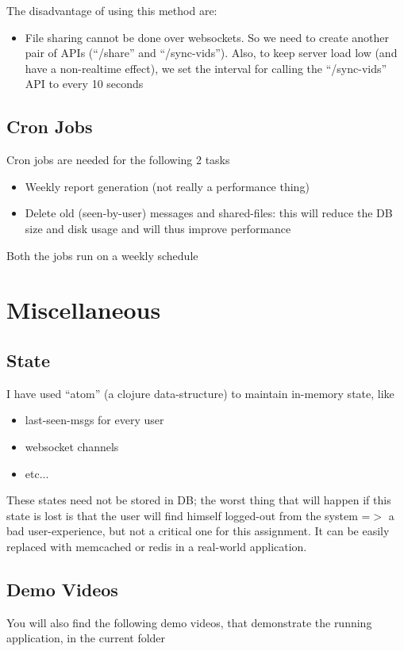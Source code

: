 \documentclass[a4paper, 10pt]{article}
\begin{document}
The disadvantage of using this method are:

\begin{itemize}
  \item File sharing cannot be done over websockets. So we need to create another pair of APIs (``/share'' and ``/sync-vids''). Also, to keep server load low (and have a non-realtime effect), we set the interval for calling the ``/sync-vids'' API to every 10 seconds
\end{itemize}

\subsection{Cron Jobs}
Cron jobs are needed for the following 2 tasks
\begin{itemize}
  \item Weekly report generation (not really a performance thing)
  \item Delete old (seen-by-user) messages and shared-files: this will reduce the DB size and disk usage and will thus improve performance
\end{itemize}
Both the jobs run on a weekly schedule

\section{Miscellaneous}
\subsection{State}
I have used ``atom'' (a clojure data-structure) to maintain in-memory state, like
\begin{itemize}
  \item last-seen-msgs for every user
  \item websocket channels
  \item etc...
\end{itemize}
These states need not be stored in DB; the worst thing that will happen if this state is lost is that the user will find himself logged-out from the system =$>$ a bad user-experience, but not a critical one for this assignment. It can be easily replaced with memcached or redis in a real-world application.

\subsection{Demo Videos}
You will also find the following demo videos, that demonstrate the running application, in the current folder
\end{document}
